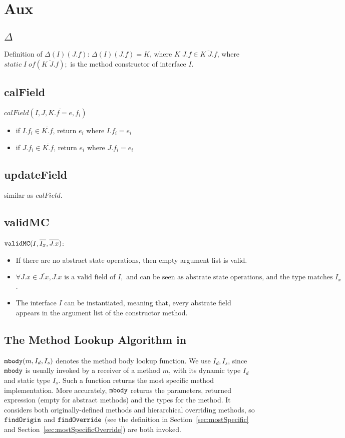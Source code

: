 \section{Aux}

\subsection{$\Delta$}

Definition of $\Delta(I)(J.f)$:
$\Delta(I)(J.f) = K$, where $K \; J.f \in \overline{K \; J.f}$, where $static \; I \; of (\overline{K \; J.f});$ is the method constructor of interface $I$.

\subsection{calField}
$ calField(I, J, \overline{K.f=e}, f_i)$
\begin{itemize}
	\item if $I.f_i \in \overline{K.f}$, return $e_i$ where $I.f_i = e_i$
	\item if $J.f_i \in \overline{K.f}$, return $e_i$ where $J.f_i = e_i$ 
\end{itemize}

\subsection{updateField}
similar as $calField$.

\subsection{validMC}
$\texttt{validMC}(I, \overline{I_x}, \overline{J.x}) $:
\begin{itemize}
	\item If there are no abstract state operations, then empty argument list is valid.
	\item $\forall J.x \in \overline{J.x}, J.x \text{ is a valid field of } I, \text{ and can be seen as abstrate state operations, and the type matches } I_x$.
	\item The interface $I$ can be instantiated, meaning that, every abstrate field appears in the argument list of the constructor method.
\end{itemize}

\subsection{The Method Lookup Algorithm in \mbody{}}\label{subsec:mbodydef}
$\texttt{mbody}(m, I_d, I_s)$ denotes the method body lookup function.
We use $I_d, I_s$, since $\texttt{mbody}$ is usually invoked by a receiver of a method $m$, with its dynamic type $I_d$ and static type $I_s$. Such a function returns the most specific method implementation. More
accurately, $\texttt{mbody}$ returns the parameters, returned expression
(empty for abstract methods) and the types for the method. It considers both originally-defined methods and hierarchical overriding methods, so $\texttt{findOrigin}$ and $\texttt{findOverride}$ (see the definition in Section~\ref{sec:mostSpecific} and Section~\ref{sec:mostSpecificOverride}) are both invoked.

